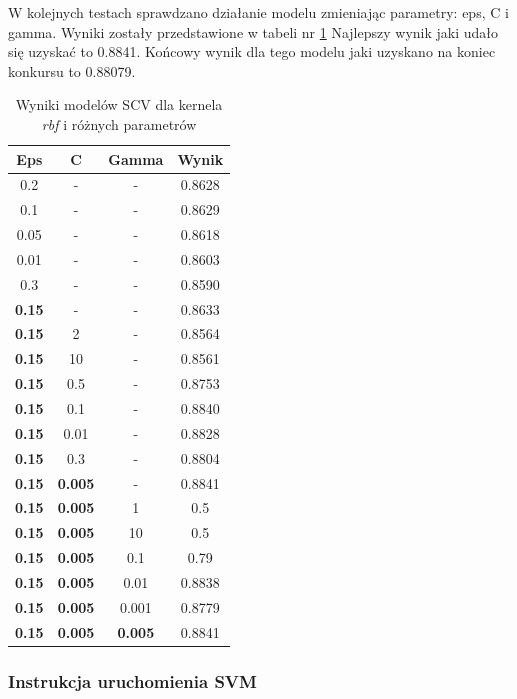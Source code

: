 \documentclass[12pt]{article}
\begin{document}
W kolejnych testach sprawdzano działanie modelu zmieniając parametry: eps, C i gamma. Wyniki zostały przedstawione w tabeli nr \ref{tab:rgf_test} Najlepszy wynik jaki udało się uzyskać to 0.8841. Końcowy wynik dla tego modelu jaki uzyskano na koniec konkursu to 0.88079.

\begin{table}[H]
    \centering
    \begin{tabular}{|c|c|c|c|}
    \hline
    Eps & C & Gamma & Wynik \\
    \hline
    \hline
    0.2 & - & - & 0.8628 \\
    \hline
    0.1 & - & - & 0.8629 \\
    \hline
    0.05 & - & - & 0.8618 \\
    \hline
    0.01 & - & - & 0.8603 \\
    \hline
    0.3 & - & - & 0.8590 \\
    \hline
    \textbf{0.15} & - & - & 0.8633 \\
    \hline
    \textbf{0.15} & 2 & - & 0.8564 \\
    \hline
    \textbf{0.15} & 10 & - & 0.8561 \\
    \hline
    \textbf{0.15} & 0.5 & - & 0.8753 \\
    \hline
    \textbf{0.15} & 0.1 & - & 0.8840 \\
    \hline
    \textbf{0.15} & 0.01 & - & 0.8828 \\
    \hline
    \textbf{0.15} & 0.3 & - & 0.8804 \\
    \hline
    \textbf{0.15} & \textbf{0.005} & - & 0.8841 \\
    \hline
    \textbf{0.15} & \textbf{0.005} & 1 & 0.5 \\
    \hline
    \textbf{0.15} & \textbf{0.005} & 10 & 0.5 \\
    \hline
    \textbf{0.15} & \textbf{0.005} & 0.1 & 0.79 \\
    \hline
    \textbf{0.15} & \textbf{0.005} & 0.01 & 0.8838 \\
    \hline
    \textbf{0.15} & \textbf{0.005} & 0.001 & 0.8779 \\
    \hline
    \textbf{0.15} & \textbf{0.005} & \textbf{0.005} & 0.8841 \\
    \hline
    \end{tabular}
    \caption{Wyniki modelów SCV dla kernela \textit{rbf} i różnych parametrów}
    \label{tab:rgf_test}
\end{table}

\subsubsection{Instrukcja uruchomienia SVM}
\end{document}
